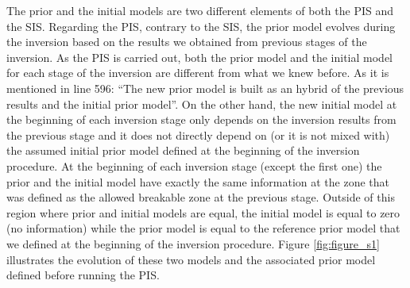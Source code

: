 \documentclass[10pt]{extarticle}
\begin{document}
\begin{Answer}
The prior and the initial models are two different elements of both the PIS and the SIS. 
Regarding the PIS, contrary to the SIS, the prior model evolves during the inversion 
based on the results we obtained from previous stages of the inversion. As the PIS is 
carried out, both the prior model and the initial model for each stage of the inversion 
are different from what we knew before. As it is mentioned in line 596: ``The new prior 
model is built as an hybrid of the previous results and the initial prior model''. On 
the other hand, the new initial model at the beginning of each inversion stage only 
depends on the inversion results from the previous stage and it does not directly 
depend on (or it is not mixed with) the assumed initial prior model defined at the 
beginning of the inversion procedure. At the beginning of each inversion stage 
(except the first one) the prior and the initial model have exactly the same 
information at the zone that was defined as the allowed breakable zone at the 
previous stage. Outside of this region where prior and initial models are equal, 
the initial model is equal to zero (no information) while the prior model is equal to 
the reference prior model that we defined at the beginning of the inversion procedure. 
Figure \ref{fig:figure_s1} illustrates the evolution of these two models and the associated 
prior model defined before running the PIS.\\
%

\end{Answer}
\end{document}
